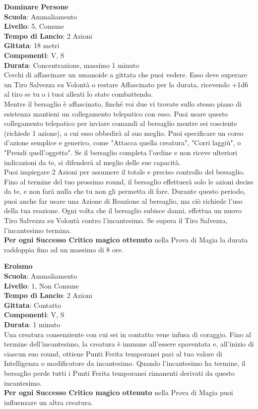 \begin{multicols}{2}
\medskip\textbf{Dominare Persone}\\
\textbf{Scuola}: Ammaliamento\\
\textbf{Livello}: 5, Comune\\
\textbf{Tempo di Lancio}: 2 Azioni\\
\textbf{Gittata}: 18 metri\\
\textbf{Componenti}: V, S\\
\textbf{Durata}: Concentrazione, massimo 1 minuto\\
Cerchi di affascinare un umanoide a gittata che puoi vedere. Esso deve superare un Tiro Salvezza su Volontà o restare Affascinato per la durata, ricevendo +1d6 al tiro se tu o i tuoi alleati lo state combattendo.\\
Mentre il bersaglio è affascinato, finché voi due vi trovate sullo stesso piano di esistenza mantieni un collegamento telepatico con esso. Puoi usare questo collegamento telepatico per inviare comandi al bersaglio mentre sei cosciente (richiede 1 azione), a cui esso obbedirà al suo meglio. Puoi specificare un corso d'azione semplice e generico, come "Attacca quella creatura", "Corri laggiù", o "Prendi quell'oggetto". Se il bersaglio completa l'ordine e non riceve ulteriori indicazioni da te, si difenderà al meglio delle sue capacità.\\
Puoi impiegare 2 Azioni per assumere il totale e preciso controllo del bersaglio. Fino al termine del tuo prossimo round, il bersaglio effettuerà solo le azioni decise da te, e non farà nulla che tu non gli permetta di fare. Durante questo periodo, puoi anche far usare una Azione di Reazione al bersaglio, ma ciò richiede l'uso della tua reazione. Ogni volta che il bersaglio subisce danni, effettua un nuovo Tiro Salvezza su Volontà contro l'incantesimo. Se supera il Tiro Salvezza, l'incantesimo termina.\\
\textbf{Per ogni Successo Critico magico ottenuto} nella Prova di Magia la durata raddoppia fino ad un massimo di 8 ore.

\medskip\textbf{Eroismo}\\
\textbf{Scuola}: Ammaliamento\\
\textbf{Livello}: 1, Non Comune\\
\textbf{Tempo di Lancio}: 2 Azioni\\
\textbf{Gittata}: Contatto\\
\textbf{Componenti}: V, S\\
\textbf{Durata}: 1 minuto\\
Una creatura consenziente con cui sei in contatto vene infusa di coraggio. Fino al termine dell'incantesimo, la creatura è immune all'essere spaventata e, all'inizio di ciascun suo round, ottiene Punti Ferita temporanei pari al tuo valore di Intelligenza o modificatore da incantesimo. Quando l'incantesimo ha termine, il bersaglio perde tutti i Punti Ferita temporanei rimanenti derivati da questo incantesimo.\\
\textbf{Per ogni Successo Critico magico ottenuto} nella Prova di Magia puoi influenzare un altra creatura.


\end{multicols}
